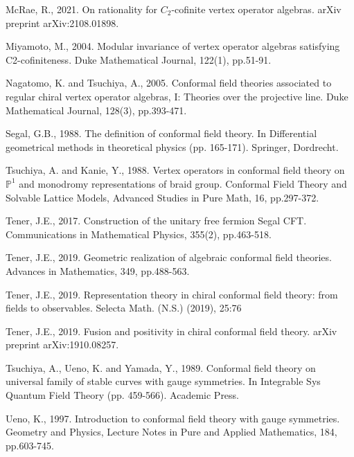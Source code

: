 \documentclass[11pt,b5paper,notitlepage]{article}
\theoremstyle{definition}
\theoremstyle{plain}
\newcommand{\Pbb}{\mathbb P}
\numberwithin{equation}{section}
\begin{document}
\begin{thebibliography}{999999}
McRae, R., 2021. On rationality for $C_2$-cofinite vertex operator algebras. arXiv preprint arXiv:2108.01898.

Miyamoto, M., 2004. Modular invariance of vertex operator algebras satisfying C2-cofiniteness. Duke Mathematical Journal, 122(1), pp.51-91.


Nagatomo, K. and Tsuchiya, A., 2005. Conformal field theories associated to regular chiral vertex operator algebras, I: Theories over the projective line. Duke Mathematical Journal, 128(3), pp.393-471.

Segal, G.B., 1988. The definition of conformal field theory. In Differential geometrical methods in theoretical physics (pp. 165-171). Springer, Dordrecht.

Tsuchiya, A. and Kanie, Y., 1988. Vertex operators in conformal field theory on $\Pbb^1$ and monodromy representations of braid group. Conformal Field Theory and Solvable Lattice Models, Advanced Studies in Pure Math, 16, pp.297-372.

Tener, J.E., 2017. Construction of the unitary free fermion Segal CFT. Communications in Mathematical Physics, 355(2), pp.463-518.



Tener, J.E., 2019. Geometric realization of algebraic conformal field theories. Advances in Mathematics, 349, pp.488-563.


Tener, J.E., 2019. Representation theory in chiral conformal field theory: from fields to
observables. Selecta Math. (N.S.) (2019), 25:76

Tener, J.E., 2019. Fusion and positivity in chiral conformal field theory. arXiv preprint arXiv:1910.08257.
		

Tsuchiya, A., Ueno, K. and Yamada, Y., 1989. Conformal field theory on universal family of stable curves with gauge symmetries. In Integrable Sys Quantum Field Theory (pp. 459-566). Academic Press.
	
Ueno, K., 1997. Introduction to conformal field theory with gauge symmetries. Geometry and Physics, Lecture Notes in Pure and Applied Mathematics, 184, pp.603-745.

		


\end{thebibliography}
\end{document}
